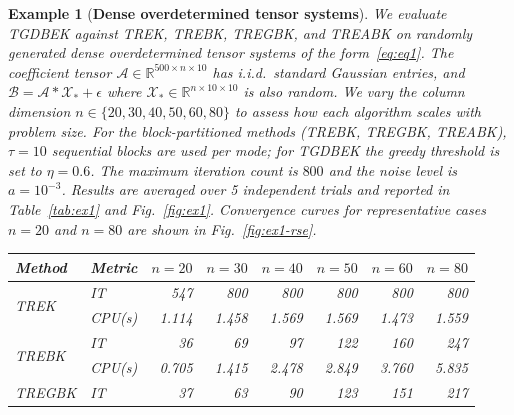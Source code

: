 \documentclass[11pt]{article}
\newtheorem{example}[theorem]{Example}
\def\fm#1{\mathcal{#1}}
\begin{document}
\begin{example}[\textbf{Dense overdetermined tensor systems}] \label{ex:dense}
We evaluate TGDBEK against TREK, TREBK, TREGBK, and TREABK on randomly generated dense overdetermined tensor systems of the form~\eqref{eq:eq1}. The coefficient tensor $\fm A \in \mathbb{R}^{500\times n\times 10}$ has i.i.d.\ standard Gaussian entries, and $\fm B = \fm A * \fm X_\ast + \fm\epsilon$ where $\fm X_\ast \in \mathbb{R}^{n\times 10\times 10}$ is also random. We vary the column dimension $n\in\{20,30,40,50,60,80\}$ to assess how each algorithm scales with problem size. For the block-partitioned methods (TREBK, TREGBK, TREABK), $\tau=10$ sequential blocks are used per mode; for TGDBEK the greedy threshold is set to $\eta=0.6$. The maximum iteration count is $800$ and the noise level is $a=10^{-3}$. Results are averaged over 5 independent trials and reported in Table~\ref{tab:ex1} and Fig.~\ref{fig:ex1}. Convergence curves for representative cases $n=20$ and $n=80$ are shown in Fig.~\ref{fig:ex1-rse}.
%
%
\begin{table}[htbp]
\centering
\small
\setlength{\tabcolsep}{4pt}
\begin{tabular}{llrrrrrr}
\toprule
Method & Metric & $n=20$ & $n=30$ & $n=40$ & $n=50$ & $n=60$ & $n=80$ \\
\midrule
\multirow{2}{*}{TREK}
  & IT     & 547   & 800   & 800   & 800   & 800   & 800   \\
  & CPU(s) & 1.114 & 1.458 & 1.569 & 1.569 & 1.473 & 1.559 \\
\midrule
\multirow{2}{*}{TREBK}
  & IT     & 36    & 69    & 97    & 122   & 160   & 247   \\
  & CPU(s) & 0.705 & 1.415 & 2.478 & 2.849 & 3.760 & 5.835 \\
\midrule
\multirow{2}{*}{TREGBK}
  & IT     & 37    & 63    & 90    & 123   & 151   & 217   \\

\end{tabular}
\end{table}
\end{example}
\end{document}
